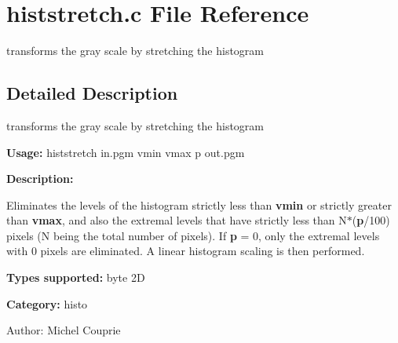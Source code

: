 \section{histstretch.c File Reference}
\label{histstretch_8c}
transforms the gray scale by stretching the histogram  




\label{_details}
\subsection{Detailed Description}
transforms the gray scale by stretching the histogram 

{\bf Usage:} histstretch in.pgm vmin vmax p out.pgm

{\bf Description:}

Eliminates the levels of the histogram strictly less than {\bf vmin} or strictly greater than {\bf vmax}, and also the extremal levels that have strictly less than N$\ast$({\bf p}/100) pixels (N being the total number of pixels). If {\bf p} = 0, only the extremal levels with 0 pixels are eliminated. A linear histogram scaling is then performed.

{\bf Types supported:} byte 2D

{\bf Category:} histo

\begin{Desc}
\item[Author:]Michel Couprie \end{Desc}
